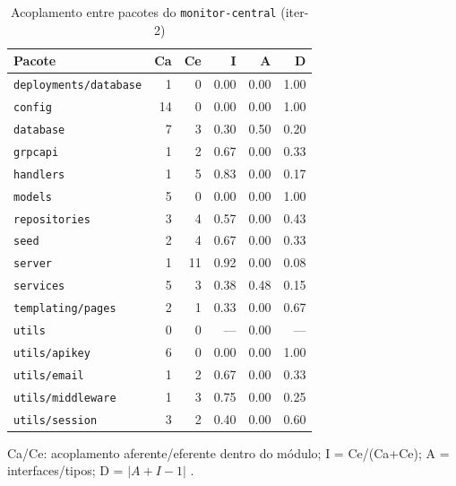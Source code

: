 \begin{table}[htbp]
  \centering\small
  \caption{Acoplamento entre pacotes do \texttt{monitor-central} (iter-2)}
  \label{tab:iter-2-acoplamento-central}
  \begin{tabular}{lrrrrr}
    \toprule
    Pacote & Ca & Ce & I & A & D \\
    \midrule
    \texttt{deployments/database} & 1 & 0 & 0.00 & 0.00 & 1.00 \\
    \texttt{config} & 14 & 0 & 0.00 & 0.00 & 1.00 \\
    \texttt{database} & 7 & 3 & 0.30 & 0.50 & 0.20 \\
    \texttt{grpcapi} & 1 & 2 & 0.67 & 0.00 & 0.33 \\
    \texttt{handlers} & 1 & 5 & 0.83 & 0.00 & 0.17 \\
    \texttt{models} & 5 & 0 & 0.00 & 0.00 & 1.00 \\
    \texttt{repositories} & 3 & 4 & 0.57 & 0.00 & 0.43 \\
    \texttt{seed} & 2 & 4 & 0.67 & 0.00 & 0.33 \\
    \texttt{server} & 1 & 11 & 0.92 & 0.00 & 0.08 \\
    \texttt{services} & 5 & 3 & 0.38 & 0.48 & 0.15 \\
    \texttt{templating/pages} & 2 & 1 & 0.33 & 0.00 & 0.67 \\
    \texttt{utils} & 0 & 0 & --- & 0.00 & --- \\
    \texttt{utils/apikey} & 6 & 0 & 0.00 & 0.00 & 1.00 \\
    \texttt{utils/email} & 1 & 2 & 0.67 & 0.00 & 0.33 \\
    \texttt{utils/middleware} & 1 & 3 & 0.75 & 0.00 & 0.25 \\
    \texttt{utils/session} & 3 & 2 & 0.40 & 0.00 & 0.60 \\
    \bottomrule
  \end{tabular}
  \par\smallskip\footnotesize Ca/Ce: acoplamento aferente/eferente dentro do módulo; I = Ce/(Ca+Ce); A = interfaces/tipos; D = $|A+I-1|$ \cite{martin2002}.
\end{table}

